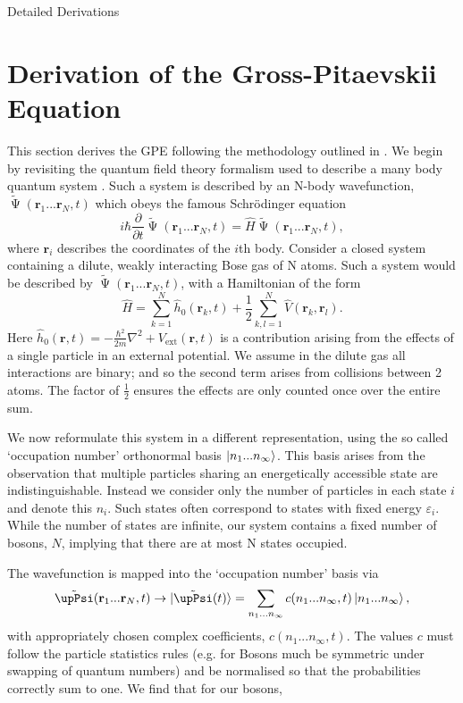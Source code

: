 \begin{chapter}{Detailed Derivations\label{app:App2}}
\section{\label{appsection:gpeqft} Derivation of the Gross-Pitaevskii Equation}
This section derives the GPE following the methodology outlined in \cite{0953-4075-41-20-203002}. We begin by revisiting the quantum field theory formalism used to describe a many body quantum system \cite{fetter1971quantum}. Such a system is described by an N-body wavefunction, $\tilde{\upPsi}(\mathbf{r}_1...\mathbf{r}_N,t)$ which obeys the famous Schr\"odinger equation
\begin{equation}
i \hbar\frac{\partial}{\partial t}\tilde{\upPsi}(\mathbf{r}_1...\mathbf{r}_N,t) = \hat{H}\tilde{\upPsi}(\mathbf{r}_1...\mathbf{r}_N,t),
\label{eq:gpeqftscho}
\end{equation}
where $\mathbf{r}_i$ describes the coordinates of the $i$th body. Consider a closed system containing a dilute, weakly interacting Bose gas of N atoms. Such a system would be described by $\tilde{\upPsi}(\mathbf{r}_1...\mathbf{r}_N,t)$, with a Hamiltonian of the form 
\begin{equation}
\hat{H} = \sum_{k=1}^N\hat{h}_0(\mathbf{r}_k,t) + \frac{1}{2}\sum_{k,l=1}^N \hat{V}(\mathbf{r}_k,\mathbf{r}_l).
\label{eq:gpeqfthamil}
\end{equation}
Here $\hat{h}_0(\mathbf{r},t) = -\frac{\hbar^2}{2m}\nabla^2+V_{\mathrm{ext}}(\mathbf{r},t)$ is a contribution arising from the effects of a single particle in an external potential. We assume in the dilute gas all interactions are binary; and so the second term arises from collisions between 2 atoms. The factor of $\frac{1}{2}$ ensures the effects are only counted once over the entire sum.

We now reformulate this system in a different representation, using the so called `occupation number' orthonormal basis $\ket{n_1...n_\infty}$. This basis arises from the observation that multiple particles sharing an energetically accessible state are indistinguishable. Instead we consider only the number of particles in each state $i$ and denote this $n_i$. Such states often correspond to states with fixed energy $\varepsilon_i$. While the number of states are infinite, our system contains a fixed number of bosons, $N$, implying that there are at most N states occupied.

The wavefunction is mapped into the `occupation number' basis via
\begin{equation*}
\tilde{\upPsi}(\mathbf{r}_1...\mathbf{r}_N,t) \rightarrow \ket{\tilde{\upPsi}(t)}=\sum_{n_1...n_\infty} c(n_1...n_\infty,t)\ket{n_1...n_\infty},
\end{equation*}
with appropriately chosen complex coefficients, $c(n_1...n_\infty,t)$. The values $c$ must follow the particle statistics rules (e.g. for Bosons much be symmetric under swapping of quantum numbers) and be normalised so that the probabilities correctly sum to one. We find that for our bosons,


\end{chapter}
